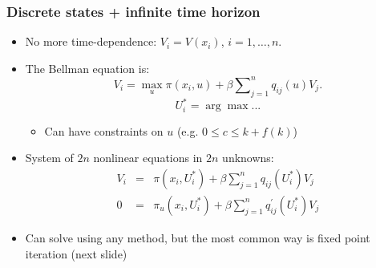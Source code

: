 \documentclass[bigger,handout]{beamer}
\begin{document}
\begin{frame}%

\frametitle{Discrete states + infinite time horizon}

\begin{itemize}
\item No more time-dependence: $V_{i}=V(x_{i})$, $i=1,\ldots ,n$.

\item The Bellman equation is:
\begin{equation}
V_{i}=\max_{u}\pi (x_{i},u)+\beta \sum\nolimits_{j=1}^{n}q_{ij}(u)V_{j}.
\label{eq:BellDiscState}
\end{equation}%
\begin{equation*}
U_{i}^{\ast }=\arg \max ...
\end{equation*}

\begin{itemize}
\item Can have constraints on $u$ (e.g. $0\leq c\leq k+f\left( k\right) $)
\end{itemize}

\item System of $2n$ nonlinear equations in $2n$ unknowns:%
\begin{eqnarray*}
V_{i} &=&\pi (x_{i},U_{i}^{\ast })+\beta
\sum\nolimits_{j=1}^{n}q_{ij}(U_{i}^{\ast })V_{j} \\
0 &=&\pi _{u}(x_{i},U_{i}^{\ast })+\beta
\sum\nolimits_{j=1}^{n}q_{ij}^{\prime }(U_{i}^{\ast })V_{j}
\end{eqnarray*}

\item Can solve using any method, but the most common way \newline
is fixed point iteration (next slide)
\end{itemize}



\end{frame}%
\end{document}
